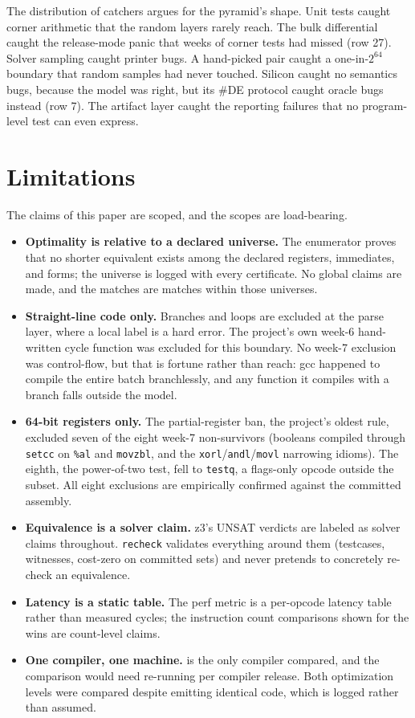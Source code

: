 \documentclass[journal,10pt]{IEEEtran}
\begin{document}
The distribution of catchers argues for the pyramid's shape. Unit
tests caught corner arithmetic that the random layers rarely reach.
The bulk differential caught the release-mode panic that weeks of
corner tests had missed (row 27). Solver sampling caught printer bugs.
A hand-picked pair caught a one-in-$2^{64}$ boundary that
\ZSolverQueries{} random samples had never touched. Silicon caught no
semantics bugs, because the model was right, but its \#DE protocol
caught oracle bugs instead (row 7). The artifact layer caught the
reporting failures that no program-level test can even express.

\section{Limitations}
\label{sec:limitations}

The claims of this paper are scoped, and the scopes are load-bearing.

\begin{itemize}
\item \textbf{Optimality is relative to a declared universe.} The
enumerator proves that no shorter equivalent exists among the declared
registers, immediates, and forms; the universe is logged with every
certificate. No global claims are made, and the \NumMatched{} matches
are matches within those universes.
\item \textbf{Straight-line code only.} Branches and loops are excluded
at the parse layer, where a local label is a hard error. The project's
own week-6 hand-written cycle function was excluded for this boundary.
No week-7 exclusion was control-flow, but that is fortune rather than
reach: gcc happened to compile the entire batch branchlessly, and any
function it compiles with a branch falls outside the model.
\item \textbf{64-bit registers only.} The partial-register ban, the
project's oldest rule, excluded seven of the eight week-7
non-survivors (booleans compiled through \texttt{setcc} on
\texttt{\%al} and \texttt{movzbl}, and the
\texttt{xorl}/\texttt{andl}/\texttt{movl} narrowing idioms). The
eighth, the power-of-two test, fell to \texttt{testq}, a flags-only
opcode outside the subset. All eight exclusions are empirically
confirmed against the committed assembly.
\item \textbf{Equivalence is a solver claim.} z3's UNSAT verdicts are
labeled as solver claims throughout. \texttt{recheck} validates
everything around them (testcases, witnesses, cost-zero on committed
sets) and never pretends to concretely re-check an equivalence.
\item \textbf{Latency is a static table.} The perf metric is a
per-opcode latency table rather than measured cycles; the instruction
count comparisons shown for the wins are count-level claims.
\item \textbf{One compiler, one machine.} \CompilerVersion{} is the
only compiler compared, and the comparison would need re-running per
compiler release. Both optimization levels were compared despite
emitting identical code, which is logged rather than assumed.
\end{itemize}
\end{document}
